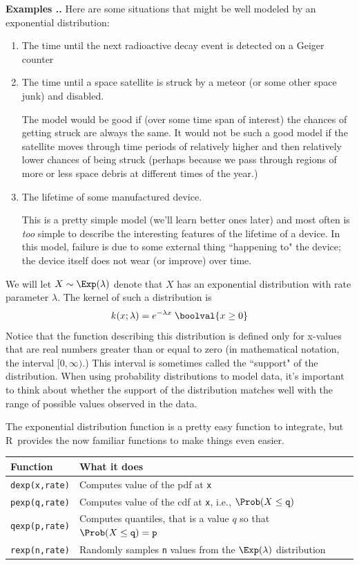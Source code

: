 \documentclass[twoside]{book}\usepackage[]{graphicx}\usepackage[]{xcolor}
\def\R{{\sf R}}
\newcounter{example}[section]
\newenvironment{examples}%
{\refstepcounter{example}%
\textbf{Examples \thesection.\arabic{example}. }}%
{}
\begin{document}
\begin{examples}
	Here are some situations that might be well modeled by an exponential distribution:
	\begin{enumerate}
\item
	The time until the next radioactive decay event is detected on a Geiger counter 

\item
	The time until a space satellite is struck by a meteor (or some other space junk) 
	and disabled.

	The model would be good if (over some time span of interest) the chances of getting
	struck are always the same.  It would not be such a good model if the satellite moves
	through time periods of relatively higher and then relatively lower chances of being
	struck (perhaps because we pass through regions of more or less space debris at 
	different times of the year.)

\item
	The lifetime of some manufactured device.

	This is a pretty simple model (we'll learn better ones later) and most often is \emph{too} simple to describe the interesting features of the lifetime of a device.  In this model, failure is due to some external thing ``happening to" the device; the 
	device itself does not wear (or improve) over time.
	\end{enumerate}
\end{examples}

We will let $X \sim \Exp(\lambda)$ denote that $X$ has an exponential distribution
with rate parameter $\lambda$.   
The kernel of such a distribution is 
\[
k(x; \lambda) = e^{-\lambda x} \; \boolval{x \ge 0}
\]
Notice that the function describing this distribution is defined only for x-values that are real numbers greater than or equal to zero (in mathematical notation, the interval $[0, \infty)$.) This interval is sometimes called the ``support" of the distribution.  When using probability distributions to model data, it's important to think about whether the support of the distribution matches well with the range of possible values observed in the data.

The exponential distribution function is a pretty easy function to integrate, but \R\ provides the now familiar
functions to make things even easier.

\begin{center}
\begin{tabular}{ll}
	\hline
	Function & What it does \\
	\hline
	\texttt{dexp(x,rate)} & Computes value of the pdf at \texttt{x}
	\\
	\texttt{pexp(q,rate)}     & Computes value of the cdf at \texttt{x}, i.e., 
	$\Prob(X \le \texttt{q})$
	\\
	\texttt{qexp(p,rate)}     & Computes quantiles, that is a value $q$ so that 
	$\Prob(X \le \texttt{q}) = \texttt{p}$
    \\
	\texttt{rexp(n,rate)} & Randomly samples \texttt{n} values from the 
	$\Exp(\lambda)$ distribution
	\\
	\hline
\end{tabular}
\end{center}
\end{document}
